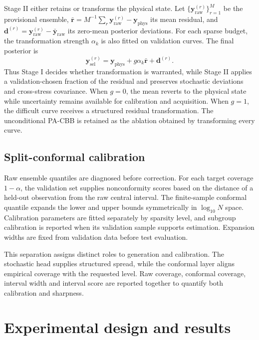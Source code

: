 \documentclass[a4paper,fleqn]{cas-dc}
\newcommand{\rawmethod}{PA-CBB}
\newcommand{\logN}{\log_{10}N}
\newcommand{\vect}[1]{\boldsymbol{#1}}
\begin{document}
Stage II either retains or transforms the physical state. Let $\{\vect{y}^{(r)}_{\mathrm{raw}}\}_{r=1}^{M}$ be the provisional ensemble, $\bar{\vect{r}}=M^{-1}\sum_r\vect{y}^{(r)}_{\mathrm{raw}}-\vect{y}_{\mathrm{phys}}$ its mean residual, and $\vect{d}^{(r)}=\vect{y}^{(r)}_{\mathrm{raw}}-\bar{\vect{y}}_{\mathrm{raw}}$ its zero-mean posterior deviations. For each sparse budget, the transformation strength $\alpha_k$ is also fitted on validation curves. The final posterior is
\begin{equation}
 \vect{y}^{(r)}_{\mathrm{sel}}=
 \vect{y}_{\mathrm{phys}}+g\alpha_k\bar{\vect{r}}+\vect{d}^{(r)}.
 \label{eq:selective_gate}
\end{equation}
Thus Stage I decides whether transformation is warranted, while Stage II applies a validation-chosen fraction of the residual and preserves stochastic deviations and cross-stress covariance. When $g=0$, the mean reverts to the physical state while uncertainty remains available for calibration and acquisition. When $g=1$, the difficult curve receives a structured residual transformation. The unconditional \rawmethod{} is retained as the ablation obtained by transforming every curve.

\subsection{Split-conformal calibration}

Raw ensemble quantiles are diagnosed before correction. For each target coverage $1-\alpha$, the validation set supplies nonconformity scores based on the distance of a held-out observation from the raw central interval. The finite-sample conformal quantile expands the lower and upper bounds symmetrically in $\logN$ space. Calibration parameters are fitted separately by sparsity level, and subgroup calibration is reported when its validation sample supports estimation. Expansion widths are fixed from validation data before test evaluation.

This separation assigns distinct roles to generation and calibration. The stochastic head supplies structured spread, while the conformal layer aligns empirical coverage with the requested level. Raw coverage, conformal coverage, interval width and interval score are reported together to quantify both calibration and sharpness.

\section{Experimental design and results}\label{sec:experiments}
\end{document}
